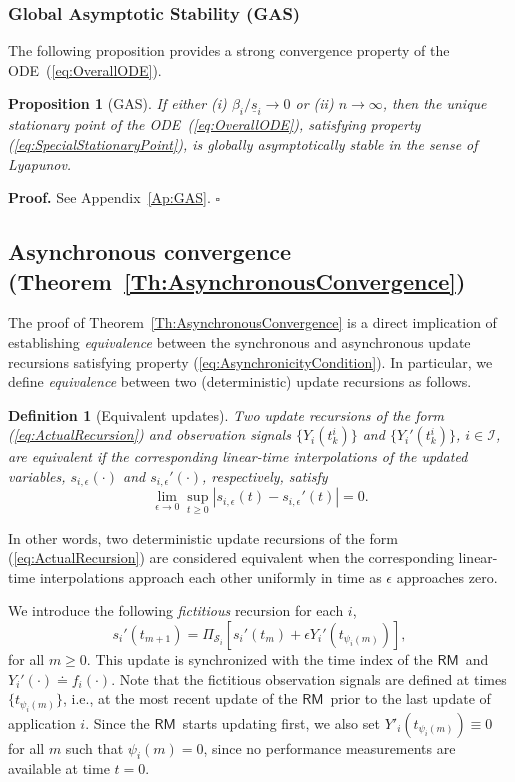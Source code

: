 \documentclass[letter,11pt]{article}
\newtheorem{definition}{Definition}[section]
\newtheorem{proposition}{Proposition}[section]
\newenvironment{proof}{\textbf{Proof.}}{$\square$\\}
\begin{document}
\subsubsection{Global Asymptotic Stability (GAS)}

The following proposition provides a strong convergence property of the ODE~(\ref{eq:OverallODE}).
\begin{proposition}[GAS]	
\label{Pr:GAS}
If either (i) $\beta_i/\underline{s}_i\to{0}$ or (ii) $n\to\infty$, then the unique stationary point of the ODE~(\ref{eq:OverallODE}), satisfying property (\ref{eq:SpecialStationaryPoint}), is globally asymptotically stable in the sense of Lyapunov.
\end{proposition}
\begin{proof}
See Appendix~\ref{Ap:GAS}.
\end{proof}

\subsection{Asynchronous convergence (Theorem~\ref{Th:AsynchronousConvergence})}	
\label{sec:TD:AsynchronousConvergence}

The proof of Theorem~\ref{Th:AsynchronousConvergence} is a direct implication of establishing \emph{equivalence} between the synchronous and asynchronous update recursions satisfying property (\ref{eq:AsynchronicityCondition}). In particular, we define \emph{equivalence} between two (deterministic) update recursions as follows. 

\begin{definition}[Equivalent updates]	\label{def:EquivalentUpdates}
Two update recursions of the form (\ref{eq:ActualRecursion}) and observation signals $\{Y_{i}(t_k^i)\}$ and $\{Y_i'(t_{k}^{i})\}$, $i\in\mathcal{I}$, are equivalent if the corresponding linear-time interpolations of the updated variables, $s_{i,\epsilon}(\cdot)$ and $s_{i,\epsilon}'(\cdot)$, respectively, satisfy $$\lim_{\epsilon\to{0}}\sup_{t\geq{0}}{\left\vert {s_{i,\epsilon}(t) - s_{i,\epsilon}'(t)} \right\vert} = 0.$$
\end{definition}
In other words, two deterministic update recursions of the form (\ref{eq:ActualRecursion}) are considered equivalent when the corresponding linear-time interpolations approach each other uniformly in time as $\epsilon$ approaches zero. 

We introduce the following \textit{fictitious} recursion for each $i$,
\begin{equation}	\label{eq:FictitiousUpdate}
s_i'(t_{m+1}) = \Pi_{\mathcal{S}_i}\left[s_i'(t_m) + \epsilon Y_{i}'(t_{\psi_i(m)})\right],
\end{equation}
for all $m\ge{0}$. This update is synchronized with the time index of the {$\mathsf{RM}$}\ and $Y_{i}'(\cdot) {\doteq} f_i(\cdot)$. Note that the fictitious observation signals are defined at times $\{t_{\psi_i(m)}\}$, i.e., at the most recent update of the {$\mathsf{RM}$}\ prior to the last update of application $i$. Since the {$\mathsf{RM}$}\ starts updating first, we also set $Y'_{i}(t_{\psi_i(m)})\equiv{0}$ for all $m$ such that $\psi_i(m)=0$, since no performance measurements are available at time $t=0$.
\end{document}
